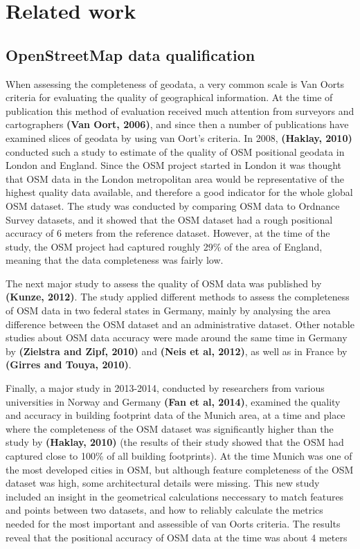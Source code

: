 \documentclass{kththesis}
\begin{document}
\section{Related work}

\subsection{OpenStreetMap data qualification}

When assessing the completeness of geodata, a very common scale is Van Oorts criteria for evaluating the quality of geographical information.
At the time of publication this method of evaluation received much attention from surveyors and cartographers \textbf{(Van Oort, 2006)}, and since then a number of publications have examined slices of geodata by using van Oort's criteria.
In 2008, \textbf{(Haklay, 2010)} conducted such a study to estimate of the quality of OSM positional geodata in London and England.
Since the OSM project started in London it was thought that OSM data in the London metropolitan area would be representative of the highest quality data available, and therefore a good indicator for the whole global OSM dataset.
The study was conducted by comparing OSM data to Ordnance Survey datasets, and it showed that the OSM dataset had a rough positional accuracy of 6 meters from the reference dataset.
However, at the time of the study, the OSM project had captured roughly 29\% of the area of England, meaning that the data completeness was fairly low.

The next major study to assess the quality of OSM data was published by \textbf{(Kunze, 2012)}.
The study applied different methods to assess the completeness of OSM data in two federal states in Germany, mainly by analysing the area difference between the OSM dataset and an administrative dataset.
Other notable studies about OSM data accuracy were made around the same time in Germany by \textbf{(Zielstra and Zipf, 2010)} and \textbf{(Neis et al, 2012)}, as well as in France by \textbf{(Girres and Touya, 2010)}.

Finally, a major study in 2013-2014, conducted by researchers from various universities in Norway and Germany \textbf{(Fan et al, 2014)}, examined the quality and accuracy in building footprint data of the Munich area, at a time and place where the completeness of the OSM dataset was significantly higher than the study by \textbf{(Haklay, 2010)} (the results of their study showed that the OSM had captured close to 100\% of all building footprints).
At the time Munich was one of the most developed cities in OSM, but although feature completeness of the OSM dataset was high, some architectural details were missing.
This new study included an insight in the geometrical calculations neccessary to match features and points between two datasets, and how to reliably calculate the metrics needed for the most important and assessible of van Oorts criteria.
The results reveal that the positional accuracy of OSM data at the time was about 4 meters
\end{document}
